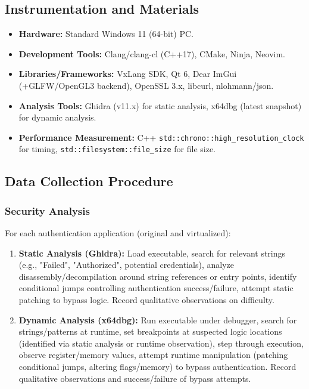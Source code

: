 \subsection{Instrumentation and Materials}
\begin{itemize}
    \item \textbf{Hardware:} Standard Windows 11 (64-bit) PC.
    \item \textbf{Development Tools:} Clang/clang-cl (C++17), CMake, Ninja, Neovim.
    \item \textbf{Libraries/Frameworks:} VxLang SDK, Qt 6, Dear ImGui (+GLFW/OpenGL3 backend), OpenSSL 3.x, libcurl, nlohmann/json.
    \item \textbf{Analysis Tools:} Ghidra (v11.x) for static analysis, x64dbg (latest snapshot) for dynamic analysis.
    \item \textbf{Performance Measurement:} C++ \texttt{std::chrono::high\_resolution\_clock} for timing, \texttt{std::filesystem::file\_size} for file size.
\end{itemize}


\subsection{Data Collection Procedure}

\subsubsection{Security Analysis}
For each authentication application (original and virtualized):
    \begin{enumerate}
        \item \textbf{Static Analysis (Ghidra):} Load executable, search for relevant strings (e.g., "Failed", "Authorized", potential credentials), analyze disassembly/decompilation around string references or entry points, identify conditional jumps controlling authentication success/failure, attempt static patching to bypass logic. Record qualitative observations on difficulty.
        \item \textbf{Dynamic Analysis (x64dbg):} Run executable under debugger, search for strings/patterns at runtime, set breakpoints at suspected logic locations (identified via static analysis or runtime observation), step through execution, observe register/memory values, attempt runtime manipulation (patching conditional jumps, altering flags/memory) to bypass authentication. Record qualitative observations and success/failure of bypass attempts.
    \end{enumerate}

